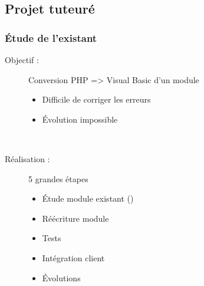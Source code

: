 \subsection{Projet tuteuré}

\begin{frame}
	\frametitle{\'Etude de l'existant}

	\begin{description}
		\item[Objectif :] Conversion PHP => Visual Basic d'un module
			\begin{itemize}
				\item Difficile de corriger les erreurs
				\item Évolution impossible
			\end{itemize}~

		\item[Réalisation : ] 5 grandes étapes
			\begin{itemize}
				\item Étude module existant ()
				\item Réécriture module
				\item Tests\sautligne

				\item Intégration client
				\item Évolutions
			\end{itemize}
	\end{description}
\end{frame}
